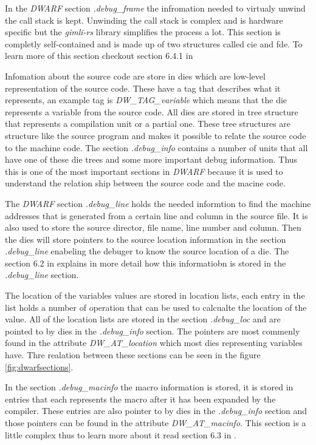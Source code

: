 In the \emph{DWARF} section \emph{.debug\_frame} the infromation needed to virtualy unwind the call stack is kept.
Unwinding the call stack is complex and is hardware specific but the \emph{gimli-rs} library simplifies the process a lot.
This section is completly self-contained and is made up of two structures called \acrfull{cie} and \acrfull{fde}.
To learn more of this section checkout section 6.4.1 in \cite{dwarf}


Infomation about the source code are store in \glspl{die} which are low-level representation of the source code.
These have a tag that describes what it represents, an example tag is \emph{DW\_TAG\_variable} which means that the \gls{die} represents a variable from the source code.
All \glspl{die} are stored in tree structure that represents a compilation unit or a partial one.
These tree structures are structure like the source program and makes it possible to relate the source code to the machine code.
The section \emph{.debug\_info} contains a number of units that all have one of these \gls{die} trees and some more important debug information.
Thus this is one of the most important sections in \emph{DWARF} because it is used to understand the relation ship between the source code and the macine code.


The \emph{DWARF} section \emph{.debug\_line} holds the needed informtion to find the machine addresses that is generated from a certain line and column in the source file.
It is also used to store the source director, file name, line number and column.
Then the \glspl{die} will store pointers to the source location information in the section \emph{.debug\_line} enabeling the debuger to know the source location of a \gls{die}.
The section 6.2 in \cite{dwarf} explains in more detail how this informatiobn is stored in the \emph{.debug\_line} section.


The location of the variables values are stored in location lists, each entry in the list holds a number of operation that can be used to calcualte the location of the value.
All of the location lists are stored in the section \emph{.debug\_loc} and are pointed to by \glspl{die} in the \emph{.debug\_info} section.
The pointers are most commenly found in the attribute \emph{DW\_AT\_location} which most dies representing variables have.
Thre realation between these sections can be seen in the figure \ref{fig:dwarfsections}.


In the section \emph{.debug\_macinfo} the macro information is stored, it is stored in entries that each represents the macro after it has been expanded by the compiler.
These entries are also pointer to by \glspl{die} in the \emph{.debug\_info} section and those pointers can be found in the attribute \emph{DW\_AT\_macinfo}.
This section is a little complex thus to learn more about it read section 6.3 in \cite{dwarf}.


